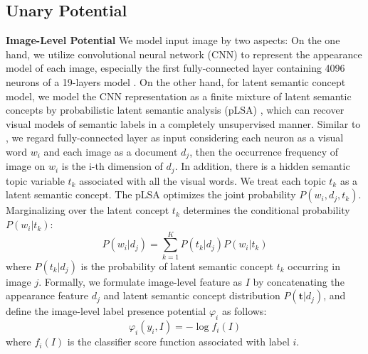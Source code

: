 \subsection{Unary Potential}
\textbf{Image-Level Potential}
We model input image by two aspects: On the one hand, we utilize convolutional neural network (CNN) to represent the appearance model of each image, especially the first fully-connected layer containing 4096 neurons of a 19-layers model \cite{simonyan2014very}.
On the other hand, for latent semantic concept model, we model the CNN representation as a finite mixture of latent semantic concepts by probabilistic latent semantic analysis (pLSA) \cite{sivic2005discovering}, which can recover visual models of semantic labels in a completely unsupervised manner.
Similar to \cite{wang2014weakly}, we regard fully-connected layer as input considering each neuron as a visual word $w_i$ and each image as a document $d_j$, then the occurrence frequency of image on $w_i$ is the i-th dimension of $d_j$.
In addition, there is a hidden semantic topic variable $t_k$ associated with all the visual words.
We treat each topic $t_k$ as a latent semantic concept. The pLSA optimizes the joint probability $P(w_i,d_j,t_k)$.
Marginalizing over the latent concept $t_k$ determines the conditional probability $P(w_i|t_k)$:
\begin{equation}
  P(w_i|d_j) = \sum_{k=1}^K{P(t_k|d_j)P(w_i|t_k)}
\end{equation}
where $P(t_k|d_j)$ is the probability of latent semantic concept $t_k$ occurring in image $j$.
Formally, we formulate image-level feature as $I$ by concatenating the appearance feature $d_j$ and latent semantic concept distribution $P(\boldsymbol{t}|d_j)$, and define the image-level label presence potential $\varphi_{i}$ as follows:
\begin{equation}
    \varphi_{i}(y_i,I) = -\log f_{i}(I)
    \label{eq:global}
\end{equation}
where $f_{i}(I)$ is the classifier score function associated with label $i$.

